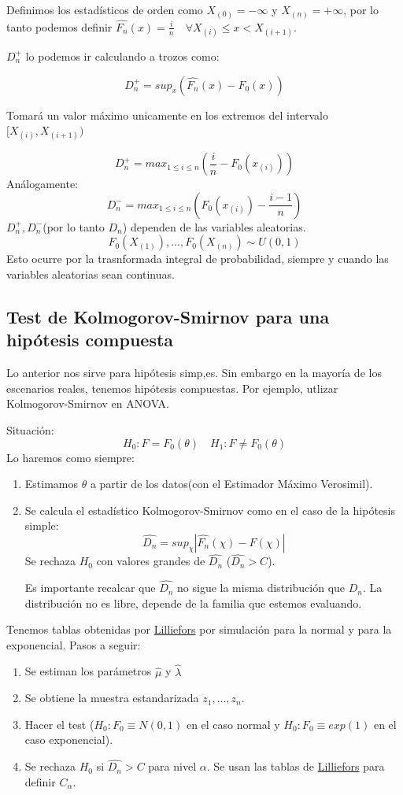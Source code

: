 Definimos los estadísticos de orden como $X_{(0)}=-\infty$ y $X_{(n)}=+\infty$, por lo tanto podemos definir $\widehat{F_n}(x)=\frac{i}{n} \quad \forall X_{(i)} \leq x < X_{(i+1)}$.

$D_n^+$ lo podemos ir calculando a trozos como:

\[
    D_n^+=sup_x(\widehat{F_n}(x)-F_0(x))
\]
    
Tomará un valor máximo unicamente en los extremos del intervalo $[X_{(i)},X_{(i+1)})$        
            
\[
    D_n^+=max_{1 \leq i \leq n}\left(\frac{i}{n}-F_0(x_{(i)})\right)
\]
Análogamente:
\[
    D_n^-=max_{1 \leq i \leq n}\left(F_0(x_{(i)})-\frac{i-1}{n}\right)
\]
$D_n^+,D_n^-$(por lo tanto $D_n$) dependen de las variables aleatorias.
\[
F_0(X_{(1)}),\dots,F_0(X_{(n)}) \sim U(0,1)
\]
Esto ocurre por la trasnformada integral de probabilidad, siempre y cuando las variables aleatorias sean continuas.

\subsection{Test de Kolmogorov-Smirnov para una hipótesis compuesta}

Lo anterior nos sirve para hipótesis simp,es. Sin embargo en la mayoría de los escenarios reales, tenemos hipótesis compuestas.
Por ejemplo, utlizar Kolmogorov-Smirnov en ANOVA.

Situación:
\[
H_0: F=F_0(\theta) \quad H_1:F \neq F_0(\theta)
\]
Lo haremos como siempre:
\begin{enumerate}
    \item Estimamos $\theta$ a partir de los datos(con el Estimador Máximo Verosimil).
    \item Se calcula el estadístico Kolmogorov-Smirnov como en el caso de la hipótesis simple:
    \[
    \widehat{D_n}=sup_\chi|\widehat{F_n}(\chi)-F(\chi)|
    \]
    Se rechaza $H_0$ con valores grandes de $\widehat{D_n}$ ($\widehat{D_n}>C$). 
    
    Es importante recalcar que $\widehat{D_n}$ no sigue la misma distribución que $D_n$.
    La distribución no es libre, depende de la familia que estemos evaluando.
\end{enumerate}

Tenemos tablas obtenidas por \href{https://es.wikipedia.org/wiki/Prueba_de_Lilliefors}{Lilliefors}
por simulación para la normal y para la exponencial.
Pasos a seguir:
\begin{enumerate}
    \item Se estiman los parámetros $\hat{\mu}$ y $\widehat{\lambda}$
    \item Se obtiene la muestra estandarizada $z_1,\dots,z_n$.
    \item Hacer el test ($H_0:F_0 \equiv N(0,1)$ en el caso normal y $H_0:F_0\equiv exp(1)$ en el caso exponencial).
    \item Se rechaza $H_0$ si $\widehat{D_n}>C$ para nivel $\alpha$. Se usan las tablas de \href{https://es.wikipedia.org/wiki/Prueba_de_Lilliefors}{Lilliefors}
    para definir $C_\alpha$.
\end{enumerate}

